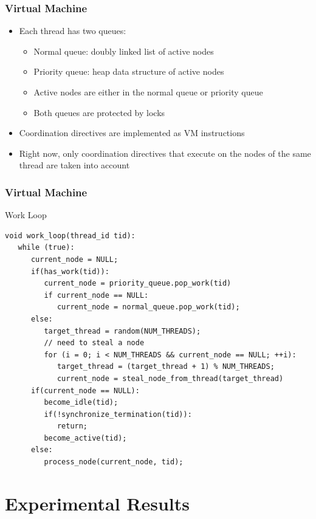 \documentclass{beamer}
\begin{document}
\begin{frame}[fragile]
   \frametitle{Virtual Machine}
   \begin{itemize}
      \item Each thread has two queues:
      \begin{itemize}
         \item Normal queue: doubly linked list of active nodes
         \item Priority queue: heap data structure of active nodes
         \item Active nodes are either in the normal queue or priority queue
         \item Both queues are protected by locks
      \end{itemize}
      \item Coordination directives are implemented as VM instructions
      \item Right now, only coordination directives that execute on the nodes of the same thread are taken into account
   \end{itemize}
\end{frame}

\begin{frame}[fragile]
   \frametitle{Virtual Machine}
   \begin{block}{Work Loop}
   \scriptsize
\begin{verbatim}
void work_loop(thread_id tid):
   while (true):
      current_node = NULL;
      if(has_work(tid)):
         current_node = priority_queue.pop_work(tid)
         if current_node == NULL:
            current_node = normal_queue.pop_work(tid);
      else:
         target_thread = random(NUM_THREADS);
         // need to steal a node
         for (i = 0; i < NUM_THREADS && current_node == NULL; ++i):
            target_thread = (target_thread + 1) % NUM_THREADS;
            current_node = steal_node_from_thread(target_thread)
      if(current_node == NULL):
         become_idle(tid);
         if(!synchronize_termination(tid)):
            return;
         become_active(tid);
      else:
         process_node(current_node, tid);
   \end{verbatim}
   \end{block}
\end{frame}

\section{Experimental Results}
\end{document}
